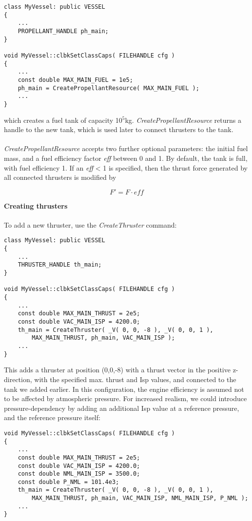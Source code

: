 \documentclass[Orbiter Developer Manual.tex]{subfiles}
\begin{document}
\begin{lstlisting}
class MyVessel: public VESSEL
{
	...
	PROPELLANT_HANDLE ph_main;
}

void MyVessel::clbkSetClassCaps( FILEHANDLE cfg )
{
	...
	const double MAX_MAIN_FUEL = 1e5;
	ph_main = CreatePropellantResource( MAX_MAIN_FUEL );
	...
}
\end{lstlisting}

\noindent
which creates a fuel tank of capacity 10$^{5}$kg. \textit{CreatePropellantResource} returns a handle to the new tank, which is used later to connect thrusters to the tank.\\
\\
\textit{CreatePropellantResource} accepts two further optional parameters: the initial fuel mass, and a fuel efficiency factor \textit{eff} between 0 and 1. By default, the tank is full, with fuel efficiency 1. If an \textit{eff} < 1 is specified, then the thrust force generated by all connected thrusters is modified by

\[ F' = F \cdot eff \]

\noindent
\textbf{Creating thrusters}\\
\\
To add a new thruster, use the \textit{CreateThruster} command:
\begin{lstlisting}
class MyVessel: public VESSEL
{
	...
	THRUSTER_HANDLE th_main;
}

void MyVessel::clbkSetClassCaps( FILEHANDLE cfg )
{
	...
	const double MAX_MAIN_THRUST = 2e5;
	const double VAC_MAIN_ISP = 4200.0;
	th_main = CreateThruster( _V( 0, 0, -8 ), _V( 0, 0, 1 ),
		MAX_MAIN_THRUST, ph_main, VAC_MAIN_ISP );
	...
}
\end{lstlisting}

\noindent
This adds a thruster at position (0,0,-8) with a thrust vector in the positive z-direction, with the specified max. thrust and Isp values, and connected to the tank we added earlier. In this configuration, the engine efficiency is assumed not to be affected by atmospheric pressure. For increased realism, we could introduce pressure-dependency by adding an additional Isp value at a reference pressure, and the reference pressure itself:


\begin{lstlisting}
void MyVessel::clbkSetClassCaps( FILEHANDLE cfg )
{
	...
	const double MAX_MAIN_THRUST = 2e5;
	const double VAC_MAIN_ISP = 4200.0;
	const double NML_MAIN_ISP = 3500.0;
	const double P_NML = 101.4e3;
	th_main = CreateThruster( _V( 0, 0, -8 ), _V( 0, 0, 1 ),
		MAX_MAIN_THRUST, ph_main, VAC_MAIN_ISP, NML_MAIN_ISP, P_NML );
	...
}
\end{lstlisting}
\end{document}
